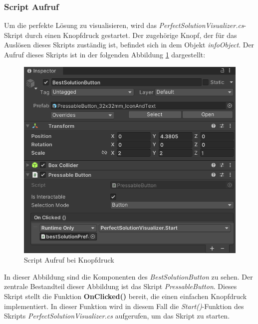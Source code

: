 \subsubsection{Script Aufruf}
Um die perfekte Lösung zu visualisieren, wird das \textit{PerfectSolutionVisualizer.cs}-Skript durch einen Knopfdruck
gestartet. Der zugehörige Knopf, der für das Auslösen dieses Skripts zuständig ist, befindet sich in dem Objekt
\textit{infoObject}. Der Aufruf dieses Skripts ist in der folgenden Abbildung \ref{fig:ScrAuf} dargestellt:
    \begin{figure}[H]
    \centering
    \includegraphics[scale=0.8]{images/perfSolBut}
    \caption{Script Aufruf bei Knopfdruck}
    \label{fig:ScrAuf}
\end{figure}
In dieser Abbildung sind die Komponenten des \textit{BestSolutionButton} zu sehen. Der zentrale Bestandteil dieser Abbildung
ist das Skript \textit{PressableButton}. Dieses Skript stellt die Funktion \textbf{OnClicked()} bereit, die einen einfachen
Knopfdruck implementiert. In dieser Funktion wird in diesem Fall die \textit{Start()}-Funktion des Skripts
\textit{PerfectSolutionVisualizer.cs} aufgerufen, um das Skript zu starten.

